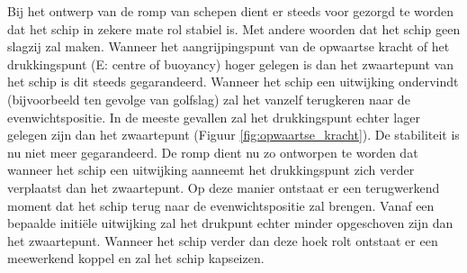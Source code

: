 Bij het ontwerp van de romp van schepen dient er steeds voor gezorgd te worden dat het schip in zekere mate rol stabiel is. Met andere woorden dat het schip geen slagzij zal maken. Wanneer het aangrijpingspunt van de opwaartse kracht of het drukkingspunt (E: centre of buoyancy) hoger gelegen is dan het zwaartepunt van het schip is dit steeds gegarandeerd. Wanneer het schip een uitwijking ondervindt (bijvoorbeeld ten gevolge van golfslag) zal het vanzelf terugkeren naar de evenwichtspositie. In de meeste gevallen zal het drukkingspunt echter lager gelegen zijn dan het zwaartepunt (Figuur \ref{fig:opwaartse_kracht}). De stabiliteit is nu niet meer gegarandeerd. De romp dient nu zo ontworpen te worden dat wanneer het schip een uitwijking aanneemt het drukkingspunt zich verder verplaatst dan het zwaartepunt. Op deze manier ontstaat er een terugwerkend moment dat het schip terug naar de evenwichtspositie zal brengen. Vanaf een bepaalde initiële uitwijking zal het drukpunt echter minder opgeschoven zijn dan het zwaartepunt. Wanneer het schip verder dan deze hoek rolt ontstaat er een meewerkend koppel en zal het schip kapseizen.